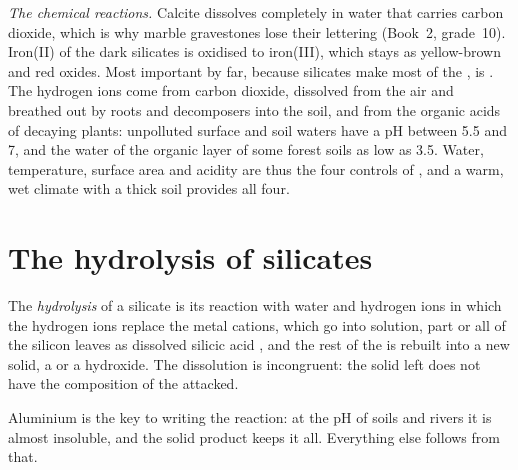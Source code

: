 \emph{The chemical reactions.} Calcite dissolves completely in water that
carries carbon dioxide, which is why marble gravestones lose their lettering
(Book~2, grade~10). Iron(II) of the dark silicates is oxidised to iron(III),
which stays as yellow-brown and red oxides. Most important by far, because
silicates make most of the , is . The hydrogen ions come from
carbon dioxide, dissolved from the air and breathed out by roots and
decomposers into the soil, and from the organic acids of decaying plants:
unpolluted surface and soil waters have a pH between 5.5 and 7, and the water
of the organic layer of some forest soils as low as 3.5. Water, temperature,
surface area and acidity are thus the four controls of ,
and a warm, wet climate with a thick soil provides all four.

\section{The hydrolysis of silicates}\label{sec:b1:weathering-clays:hydrolysis}

\begin{definition}\label{def:b1:weathering-clays:hydrolysis}
The \emph{hydrolysis} of a silicate is its
reaction with water and hydrogen ions in which the hydrogen ions replace the
metal cations, which go into solution, part or all of the silicon leaves as
dissolved silicic acid , and the rest of the  is rebuilt into
a new solid, a  or a hydroxide. The dissolution is incongruent:
the solid left does not have the composition of the  attacked.
\end{definition}

Aluminium is the key to writing the reaction: at the pH of soils and rivers it
is almost insoluble, and the solid product keeps it all. Everything else
follows from that.

